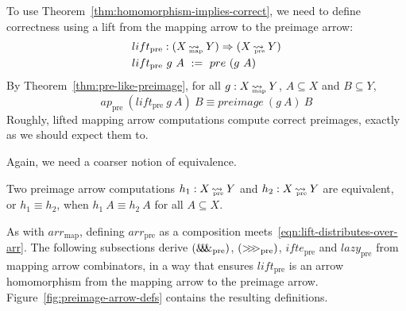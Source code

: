 \documentclass[preprint]{sigplanconf}
\newcommand{\arrow}{\rightsquigarrow}
\newcommand{\arrowlift}{\ensuremath{lift}}
\newcommand{\arrowarr}{\ensuremath{arr}}
\newcommand{\arrowcomp}{\ensuremath{{>}\mspace{-6mu}{>}\mspace{-6mu}{>}}}
\newcommand{\arrowpair}{\ensuremath{\mathit{\&\mspace{-7.5mu}\&\mspace{-7.5mu}\&}}}
\newcommand{\arrowif}{\ensuremath{ifte}}
\newcommand{\arrowlazy}{\ensuremath{lazy}}
\newcommand{\map}{_\mathrm{map}}
\DeclareMathOperator{\mapto}{\arrow_{\mspace{-21mu}\map}}
\newcommand{\arrmap}{\arrowarr\map}
\newcommand{\pre}{_\mathrm{pre}}
\DeclareMathOperator{\preto}{\arrow_{\mspace{-19mu}\pre}}
\newcommand{\liftpre}{\arrowlift\pre}
\newcommand{\arrpre}{\arrowarr\pre}
\newcommand{\comppre}{\arrowcomp\pre}
\newcommand{\pairpre}{\arrowpair\pre}
\newcommand{\ifpre}{\arrowif\pre}
\newcommand{\lazypre}{\arrowlazy\pre}
\begin{document}
To use Theorem~\ref{thm:homomorphism-implies-correct}, we need to define correctness using a lift from the mapping arrow to the preimage arrow:
\begin{equation}
\begin{aligned}
	&\liftpre : (X \mapto Y) \tto (X \preto Y) \\
	&\liftpre~g~A \ := \ pre~(g~A)
\end{aligned}
\end{equation}
By Theorem~\ref{thm:pre-like-preimage}, for all $g : X \mapto Y$, $A \subseteq X$ and $B \subseteq Y$,
\begin{equation}
	ap\pre~(\liftpre~g~A)~B \equiv preimage~(g~A)~B
\end{equation}
Roughly, lifted mapping arrow computations compute correct preimages, exactly as we should expect them to.

Again, we need a coarser notion of equivalence.

\begin{definition}
Two preimage arrow computations $h_1 : X \preto Y$ and $h_2 : X \preto Y$ are equivalent, or $h_1 \equiv h_2$, when 
$h_1~A \equiv h_2~A$ for all $A \subseteq X$.
\end{definition}

As with $\arrmap$, defining $\arrpre$ as a composition meets~\eqref{eqn:lift-distributes-over-arr}.
The following subsections derive $(\pairpre)$, $(\comppre)$, $\ifpre$ and $\lazypre$ from mapping arrow combinators, in a way that ensures $\liftpre$ is an arrow homomorphism from the mapping arrow to the preimage arrow. Figure~\ref{fig:preimage-arrow-defs} contains the resulting definitions.
\end{document}
